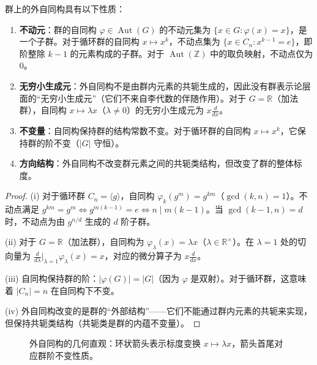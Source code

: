 \begin{proposition}[外自同构的基本性质]\label{prop:scaling_operator}
群上的外自同构具有以下性质：
\begin{enumerate}[label=(\roman*)]
    \item \textbf{不动元}：群的自同构 $\varphi \in \operatorname{Aut}(G)$ 的不动元集为 $\{x \in G : \varphi(x) = x\}$，是一个子群。对于循环群的自同构 $x \mapsto x^k$，不动点集为 $\{x \in C_n : x^{k-1} = e\}$，即阶整除 $k-1$ 的元素构成的子群。对于 $\operatorname{Aut}(\mathbb{Z})$ 中的取负映射，不动点仅为 $0$。
    \item \textbf{无穷小生成元}：外自同构不是由群内元素的共轭生成的，因此没有群表示论层面的“无穷小生成元”（它们不来自李代数的伴随作用）。对于 $G = \mathbb{R}$（加法群），自同构 $x \mapsto \lambda x$（$\lambda \neq 0$）的无穷小生成元为 $x \frac{d}{dx}$。
    \item \textbf{不变量}：自同构保持群的结构常数不变。对于循环群的自同构 $x \mapsto x^k$，它保持群的阶不变（$|G|$ 守恒）。
    \item \textbf{方向结构}：外自同构不改变群元素之间的共轭类结构，但改变了群的整体标度。
\end{enumerate}
\end{proposition}

\begin{proof}
(i) 对于循环群 $C_n = \langle g \rangle$，自同构 $\varphi_k(g^m) = g^{km}$（$\gcd(k,n)=1$）。不动点满足 $g^{km} = g^m \iff g^{m(k-1)} = e \iff n \mid m(k-1)$。当 $\gcd(k-1,n) = d$ 时，不动点为由 $g^{n/d}$ 生成的 $d$ 阶子群。

(ii) 对于 $G = \mathbb{R}$（加法群），自同构为 $\varphi_\lambda(x) = \lambda x$（$\lambda \in \mathbb{R}^\times$）。在 $\lambda = 1$ 处的切向量为 $\frac{d}{d\lambda}\big|_{\lambda=1} \varphi_\lambda(x) = x$，对应的微分算子为 $x \frac{d}{dx}$。

(iii) 自同构保持群的阶：$|\varphi(G)| = |G|$（因为 $\varphi$ 是双射）。对于循环群，这意味着 $|C_n| = n$ 在自同构下不变。

(iv) 外自同构改变的是群的“外部结构”——它们不能通过群内元素的共轭来实现，但保持共轭类结构（共轭类是群的内蕴不变量）。
\end{proof}

\begin{figure}[htbp]
\centering
{}
\caption{外自同构的几何直观：环状箭头表示标度变换 $x \mapsto \lambda x$，箭头首尾对应群阶不变性质。}
\label{fig:outer_automorphism_scaling}
\end{figure}

